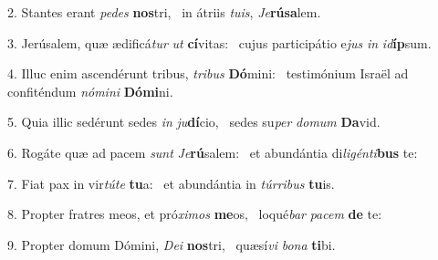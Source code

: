 2. Stantes erant \textit{pe}\textit{des} \textbf{nos}tri, \ast\  in átriis \textit{tu}\textit{is}, \textit{Je}\textbf{rú}\textbf{sa}lem.\

3. Jerúsalem, quæ ædificá\textit{tur} \textit{ut} \textbf{cí}vitas: \ast\  cujus participátio e\textit{jus} \textit{in} \textit{id}\textbf{íp}sum.\

4. Illuc enim ascendérunt tribus, \textit{tri}\textit{bus} \textbf{Dó}mini: \ast\  testimónium Israël ad confiténdum \textit{nó}\textit{mi}\textit{ni} \textbf{Dó}\textbf{mi}ni.\

5. Quia illic sedérunt sedes \textit{in} \textit{ju}\textbf{dí}cio, \ast\  sedes su\textit{per} \textit{do}\textit{mum} \textbf{Da}vid.\

6. Rogáte quæ ad pacem \textit{sunt} \textit{Je}\textbf{rú}salem: \ast\  et abundántia di\textit{li}\textit{gén}\textit{ti}\textbf{bus} te:\

7. Fiat pax in vir\textit{tú}\textit{te} \textbf{tu}a: \ast\  et abundántia in \textit{túr}\textit{ri}\textit{bus} \textbf{tu}is.\

8. Propter fratres meos, et pró\textit{xi}\textit{mos} \textbf{me}os, \ast\  loqué\textit{bar} \textit{pa}\textit{cem} \textbf{de} te:\

9. Propter domum Dómini, \textit{De}\textit{i} \textbf{nos}tri, \ast\  quæsí\textit{vi} \textit{bo}\textit{na} \textbf{ti}bi.\


